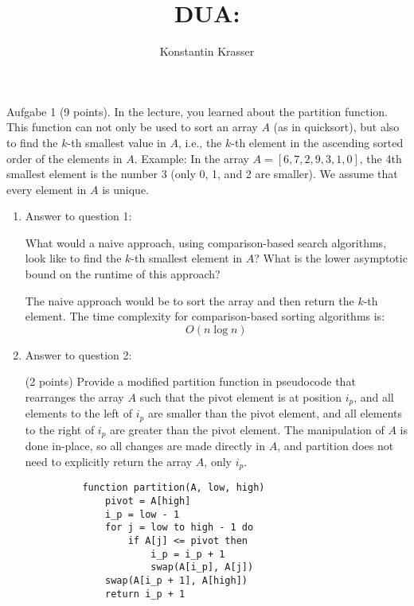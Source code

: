 \documentclass[11pt]{article}
\begin{document}
\author{Konstantin Krasser}
\title{DUA: }
\maketitle

\medskip

Aufgabe 1 (9 points). In the lecture, you learned about the partition function. This function can not only be used to sort an array \(A\) (as in quicksort), but also to find the \(k\)-th smallest value in \(A\), i.e., the \(k\)-th element in the ascending sorted order of the elements in \(A\).
Example: In the array \(A=[6,7,2,9,3,1,0]\), the 4th smallest element is the number 3 (only 0, 1, and 2 are smaller). We assume that every element in \(A\) is unique.
\begin{enumerate}

	\item Answer to question 1:

	      What would a naive approach, using comparison-based search algorithms, look like to find the \(k\)-th smallest element in \(A\)? What is the lower asymptotic bound on the runtime of this approach?

	      The naive approach would be to sort the array and then return the \(k\)-th element. The time complexity for comparison-based sorting algorithms is:
	      \begin{equation}
		      O(n \log n)
	      \end{equation}

	\item Answer to question 2:

	      (2 points) Provide a modified partition function in pseudocode that rearranges the array \(A\) such that the pivot element is at position \(i_p\), and all elements to the left of \(i_p\) are smaller than the pivot element, and all elements to the right of \(i_p\) are greater than the pivot element. The manipulation of \(A\) is done in-place, so all changes are made directly in \(A\), and partition does not need to explicitly return the array \(A\), only \(i_p\).

	      \begin{verbatim}
	      function partition(A, low, high)
	          pivot = A[high]
	          i_p = low - 1
	          for j = low to high - 1 do
	              if A[j] <= pivot then
	                  i_p = i_p + 1
	                  swap(A[i_p], A[j])
	          swap(A[i_p + 1], A[high])
	          return i_p + 1
	      \end{verbatim}


\end{enumerate}
\end{document}

